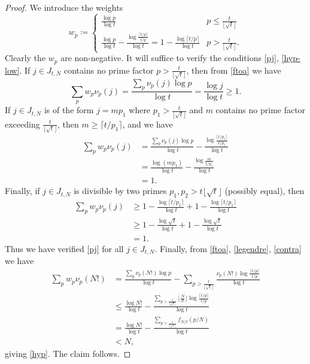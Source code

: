 \documentclass[12pt,a4paper,reqno]{amsart}
\numberwithin{equation}{section}
\theoremstyle{plain}
\theoremstyle{definition}
\begin{document}
\begin{proof} We introduce the weights
  $$ 
w_p \coloneqq  \begin{cases} 
  \frac{\log p}{\log t} & p  \leq \frac{t}{\lfloor \sqrt{t} \rfloor} \\
  \frac{\log p}{\log t} - \frac{\log \frac{\lceil t/p \rceil}{t/p}}{\log t} = 1 - \frac{\log \lceil t/p \rceil}{\log t} & p  > \frac{t}{\lfloor \sqrt{t} \rfloor}.
\end{cases}
$$
Clearly the $w_p$ are non-negative.  It will suffice to verify the conditions \eqref{pj}, \eqref{hyp-low}.  If $j \in J_{t,N}$ contains no prime factor $p > \frac{t}{\lfloor \sqrt{t} \rfloor}$, then from \eqref{ftoa} we have
$$ \sum_p w_p \nu_p(j) = \frac{\sum_p \nu_p(j) \log p}{\log t} = \frac{\log j}{\log t} \geq 1.$$
If $j \in J_{t,N}$ is of the form $j = mp_1$ where $p_1 > \frac{t}{\lfloor \sqrt{t} \rfloor}$ and $m$ contains no prime factor exceeding $\frac{t}{\lfloor \sqrt{t} \rfloor}$, then $m \geq \lceil t/p_1 \rceil$, and we have
\begin{align*}
\sum_p w_p \nu_p(j) &= \frac{\sum_p \nu_p(j) \log p}{\log t}
- \frac{\log \frac{\lceil t/p_1 \rceil}{t/p_1}}{\log t}\\
&= \frac{\log(mp_1)}{\log t} -  \frac{\log \frac{m}{t/p_1}}{\log t} \\
&= 1.
\end{align*}
Finally, if $j \in J_{t,N}$ is divisible by two primes $p_1, p_2 > {t}{\lfloor \sqrt{t} \rfloor}$ (possibly equal), then
\begin{align*}
  \sum_p w_p \nu_p(j) &\geq
  1 - \frac{\log \lceil t/p_1 \rceil}{\log t} + 1 - \frac{\log \lceil t/p_1 \rceil}{\log t} \\
  &\geq
  1 - \frac{\log \sqrt{t}}{\log t} + 1 - \frac{\log \sqrt{t}}{\log t} \\
  &= 1.
\end{align*}
Thus we have verified \eqref{pj} for all $j \in J_{t,N}$.  Finally, from \eqref{ftoa}, \eqref{legendre}, \eqref{contra} we have
\begin{align*}
  \sum_p w_p \nu_p(N!) &= \frac{\sum_p \nu_p(N!) \log p}{\log t} - \sum_{p > \frac{t}{\lfloor \sqrt{t} \rfloor}} \frac{\nu_p(N!) \log \frac{\lceil t/p \rceil}{t/p}}{\log t} \\
  &\leq \frac{\log N!}{\log t} -  \frac{\sum_{p > \frac{t}{\lfloor \sqrt{t} \rfloor}} \lfloor \frac{N}{p} \rfloor \log \frac{\lceil t/p \rceil}{t/p}}{\log t}\\
  &= \frac{\log N!}{\log t} - \frac{\sum_{p > \frac{t}{\lfloor \sqrt{t} \rfloor}} f_{N/t}(p/N)}{\log t} \\
  &< N,
\end{align*}
giving \eqref{hyp}.  The claim follows.
\end{proof}
\end{document}
